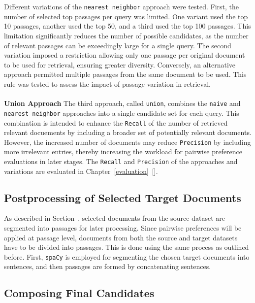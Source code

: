 \\\\
Different variations of the \texttt{nearest neighbor} approach were tested. First, the number of selected top passages per query was limited. One variant used the top 10 passages, another used the top 50, and a third used the top 100 passages. This limitation significantly reduces the number of possible candidates, as the number of relevant passages can be exceedingly large for a single query. The second variation imposed a restriction allowing only one passage per original document to be used for retrieval, ensuring greater diversity. Conversely, an alternative approach permitted multiple passages from the same document to be used. This rule was tested to assess the impact of passage variation in retrieval.
\\\\
\textbf{Union Approach} The third approach, called \texttt{union}, combines the \texttt{naive} and \texttt{nearest neighbor} approaches into a single candidate set for each query. This combination is intended to enhance the \texttt{Recall} of the number of retrieved relevant docuements by including a broader set of potentially relevant documents. However, the increased number of documents may reduce \texttt{Precision} by including more irrelevant entries, thereby increasing the workload for pairwise preference evaluations in later stages. The \texttt{Recall} and \texttt{Precision} of the approaches and variations are evaluated in Chapter~\ref{evaluation}~[].

\subsection{Postprocessing of Selected Target Documents}\label{postprocessing-of-selected-target-documents}

As described in Section~, selected documents from the source dataset are segmented into passages for later processing. Since pairwise preferences will be applied at passage level, documents from both the source and target datasets have to be divided into passages. This is done using the same process as outlined before. First, \texttt{spaCy} is employed for segmenting the chosen target documents into sentences, and then passages are formed by concatenating sentences.

\subsection{Composing Final Candidates}\label{composing-final-candidates}

